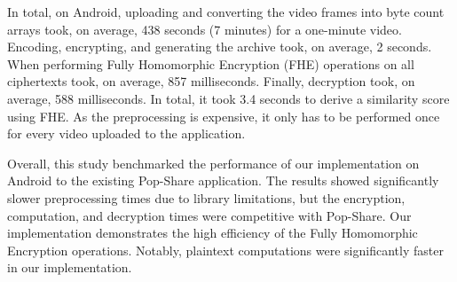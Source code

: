 In total, on Android, uploading and converting the video frames into byte count arrays took, on average, 438 seconds (7 minutes) for a one-minute video. Encoding, encrypting, and generating the archive took, on average, 2 seconds. When performing Fully Homomorphic Encryption (FHE) operations on all ciphertexts took, on average, 857 milliseconds. Finally, decryption took, on average, 588 milliseconds. In total, it took 3.4 seconds to derive a similarity score using FHE. As the preprocessing is expensive, it only has to be performed once for every video uploaded to the application.

Overall, this study benchmarked the performance of our implementation on Android to the existing Pop-Share application. The results showed significantly slower preprocessing times due to library limitations, but the encryption, computation, and decryption times were competitive with Pop-Share. Our implementation demonstrates the high efficiency of the Fully Homomorphic Encryption operations. Notably, plaintext computations were significantly faster in our implementation.
